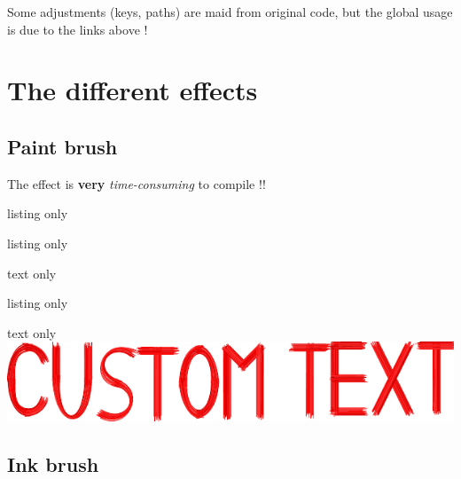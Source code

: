\documentclass[11pt,a4paper]{ltxdoc}
\begin{document}
Some adjustments (keys, paths) are maid from original code, but the global usage is due to the links above !

\pagebreak

\section{The different effects}

\subsection{Paint brush}

{\small\faBomb} The effect is \textbf{very} \textit{time-consuming} to compile !!

\begin{DemoCode}{listing only}

\end{DemoCode}

\begin{DemoCode}{listing only}
\end{DemoCode}

\begin{DemoCode}{text only}

\end{DemoCode}

\begin{DemoCode}{listing only}
\end{DemoCode}

\begin{DemoCode}{text only}
\includegraphics{tkzbrushA.pdf}
\end{DemoCode}

\pagebreak

\subsection{Ink brush}
\end{document}
